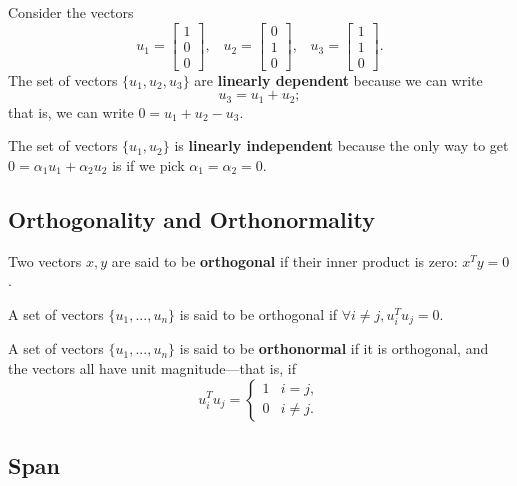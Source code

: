 \documentclass[12pt]{article}
\begin{document}
\begin{example}Consider the vectors 
%
\begin{equation*}
u_1 = \left[ \begin{matrix}
1 \\ 0 \\ 0
\end{matrix}\right], \;\;\; u_2 = \left[ \begin{matrix}
0 \\ 1 \\ 0
\end{matrix}\right], \;\;\; u_3 = \left[ \begin{matrix}
1 \\ 1 \\ 0
\end{matrix}\right].
\end{equation*}
%
The set of vectors $\{u_1, u_2, u_3\}$ are \textbf{linearly dependent} because we can write
%
\begin{equation*}
u_3 = u_1 + u_2;
\end{equation*}
%
that is, we can write $0 = u_1 + u_2 - u_3$.

The set of vectors $\{u_1, u_2\}$ is \textbf{linearly independent} because the only way to get $0 = \alpha_1 u_1 + \alpha_2 u_2$ is if we pick $\alpha_1 = \alpha_2 = 0$. 
\end{example}

\subsection{Orthogonality and Orthonormality}

Two vectors $x,y$ are said to be \textbf{orthogonal} if their inner product is zero: $x^T y = 0$. 

A set of vectors $\{u_1,..., u_n\}$ is said to be orthogonal if $\forall i \neq j, u_i^T u_j = 0$. 

A set of vectors $\{u_1, ..., u_n\}$ is said to be \textbf{orthonormal} if it is orthogonal, and the vectors all have unit magnitude---that is, if
%
\begin{equation*}
u_i^T u_j = \left\{ \begin{array}{ll}
1 & i = j, \\
0 & i \neq j.
\end{array}\right.
\end{equation*}

\subsection{Span}
\end{document}
